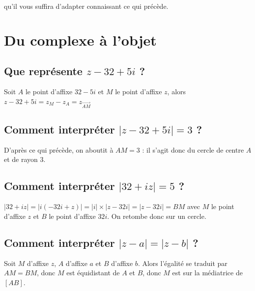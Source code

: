 \documentclass[french]{book}
\newcommand{\ve}[1]{\overrightarrow{#1}}
\begin{document}
qu'il vous suffira d'adapter connaissant ce qui précède.
\newpage 









\section{Du complexe à l'objet}




\subsection{Que représente $z-32+5i$ ?}

 Soit $A$ le point d'affixe $32-5i$ et $M$ le point d'affixe $z$, alors
 $z-32+5i=z_M-z_A=z_{\ve{AM}}$



\subsection{Comment interpréter $\vert z-32+5i \vert =3 $ ?}

D'après ce qui précède, on aboutit à $AM=3$ : il s'agit donc du cercle de centre $A$ et de rayon 3.

\subsection{Comment interpréter $ \vert 32+iz \vert =5 $ ?}

 $|32+iz|=|i(-32i+z)|=|i|\times|z-32i|=|z-32i|=BM$ avec $M$ le
 point d'affixe $z$ et $B$ le point d'affixe $32i$. On retombe donc sur un cercle.


\subsection{Comment interpréter $ \vert z-a \vert = \vert z-b \vert $ ?}

Soit $M$ d'affixe $z$, $A$ d'affixe $a$ et $B$ d'affixe $b$. Alors
l'égalité se traduit par $AM=BM$, donc $M$ est équidistant de $A$
et $B$, donc $M$ est sur la médiatrice de $[AB]$.
\end{document}
